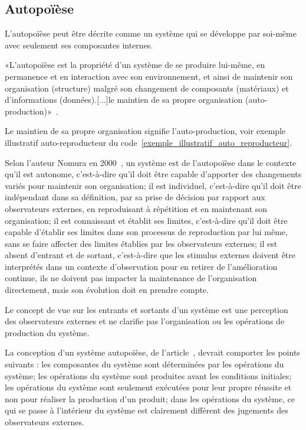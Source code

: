 \subsection{Autopoïèse}

L'autopoïèse peut être décrite comme un système qui se développe par soi-même avec seulement ses composantes internes.

«L'autopoïèse est la propriété d'un système de se produire lui-même, en permanence et en interaction avec son environnement, et ainsi de maintenir son organisation (structure) malgré son changement de composants (matériaux) et d'informations (données).[...]le maintien de sa propre organisation (auto-production)»~\cite{wiki_autopoiesis_2022}.

Le maintien de sa propre organisation signifie l'auto-production, voir exemple illustratif auto-reproducteur du code~\ref{exemple_illustratif_auto_reproducteur}.

Selon l'auteur Nomura en 2000~\cite{tatsuya_computational_autopoiesis_2000}, un système est de l'autopoïèse dans le contexte qu'il est autonome, c'est-à-dire qu'il doit être capable d'apporter des changements variés pour maintenir son organisation; il est individuel, c'est-à-dire qu'il doit être indépendant dans sa définition, par sa prise de décision par rapport aux observateurs externes, en reproduisant à répétition et en maintenant son organisation; il est connaissant et établit ses limites, c'est-à-dire qu'il doit être capable d'établir ses limites dans son processus de reproduction par lui même, sans se faire affecter des limites établies par les observateurs externes; il est absent d'entrant et de sortant, c'est-à-dire que les stimulus externes doivent être interprétés dans un contexte d'observation pour en retirer de l'amélioration continue, ils ne doivent pas impacter la maintenance de l'organisation directement, mais son évolution doit en prendre compte.


Le concept de vue sur les entrants et sortants d'un système est une perception des observateurs externes et ne clarifie pas l'organisation ou les opérations de production du système. 

La conception d'un système autopoïèse, de l'article~\cite{tatsuya_computational_autopoiesis_2000}, devrait comporter les points suivants : les composantes du système sont déterminées par les opérations du système; les opérations du système sont produites avant les conditions initiales; les opérations du système sont seulement exécutées pour leur propre réussite et non pour réaliser la production d'un produit; dans les opérations du système, ce qui se passe à l'intérieur du système est clairement différent des jugements des observateurs externes.

